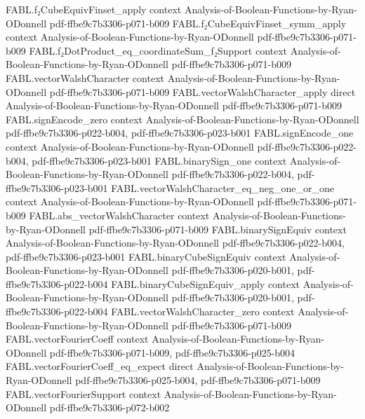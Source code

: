 \begin{theorem}
  {FABL.f₂CubeEquivFinset_apply}
  {context}
  {Analysis-of-Boolean-Functions-by-Ryan-ODonnell}
  {pdf-ffbe9c7b3306-p071-b009}
\proofstep
  {FABL.f₂CubeEquivFinset_symm_apply}
  {context}
  {Analysis-of-Boolean-Functions-by-Ryan-ODonnell}
  {pdf-ffbe9c7b3306-p071-b009}
\proofstep
  {FABL.f₂DotProduct_eq_coordinateSum_f₂Support}
  {context}
  {Analysis-of-Boolean-Functions-by-Ryan-ODonnell}
  {pdf-ffbe9c7b3306-p071-b009}
\proofstep
  {FABL.vectorWalshCharacter}
  {context}
  {Analysis-of-Boolean-Functions-by-Ryan-ODonnell}
  {pdf-ffbe9c7b3306-p071-b009}
\proofstep
  {FABL.vectorWalshCharacter_apply}
  {direct}
  {Analysis-of-Boolean-Functions-by-Ryan-ODonnell}
  {pdf-ffbe9c7b3306-p071-b009}
\proofstep
  {FABL.signEncode_zero}
  {context}
  {Analysis-of-Boolean-Functions-by-Ryan-ODonnell}
  {pdf-ffbe9c7b3306-p022-b004,
    pdf-ffbe9c7b3306-p023-b001}
\proofstep
  {FABL.signEncode_one}
  {context}
  {Analysis-of-Boolean-Functions-by-Ryan-ODonnell}
  {pdf-ffbe9c7b3306-p022-b004,
    pdf-ffbe9c7b3306-p023-b001}
\proofstep
  {FABL.binarySign_one}
  {context}
  {Analysis-of-Boolean-Functions-by-Ryan-ODonnell}
  {pdf-ffbe9c7b3306-p022-b004,
    pdf-ffbe9c7b3306-p023-b001}
\proofstep
  {FABL.vectorWalshCharacter_eq_neg_one_or_one}
  {context}
  {Analysis-of-Boolean-Functions-by-Ryan-ODonnell}
  {pdf-ffbe9c7b3306-p071-b009}
\proofstep
  {FABL.abs_vectorWalshCharacter}
  {context}
  {Analysis-of-Boolean-Functions-by-Ryan-ODonnell}
  {pdf-ffbe9c7b3306-p071-b009}
\proofstep
  {FABL.binarySignEquiv}
  {context}
  {Analysis-of-Boolean-Functions-by-Ryan-ODonnell}
  {pdf-ffbe9c7b3306-p022-b004,
    pdf-ffbe9c7b3306-p023-b001}
\proofstep
  {FABL.binaryCubeSignEquiv}
  {context}
  {Analysis-of-Boolean-Functions-by-Ryan-ODonnell}
  {pdf-ffbe9c7b3306-p020-b001,
    pdf-ffbe9c7b3306-p022-b004}
\proofstep
  {FABL.binaryCubeSignEquiv_apply}
  {context}
  {Analysis-of-Boolean-Functions-by-Ryan-ODonnell}
  {pdf-ffbe9c7b3306-p020-b001,
    pdf-ffbe9c7b3306-p022-b004}
\proofstep
  {FABL.vectorWalshCharacter_zero}
  {context}
  {Analysis-of-Boolean-Functions-by-Ryan-ODonnell}
  {pdf-ffbe9c7b3306-p071-b009}
\proofstep
  {FABL.vectorFourierCoeff}
  {context}
  {Analysis-of-Boolean-Functions-by-Ryan-ODonnell}
  {pdf-ffbe9c7b3306-p071-b009,
    pdf-ffbe9c7b3306-p025-b004}
\proofstep
  {FABL.vectorFourierCoeff_eq_expect}
  {direct}
  {Analysis-of-Boolean-Functions-by-Ryan-ODonnell}
  {pdf-ffbe9c7b3306-p025-b004,
    pdf-ffbe9c7b3306-p071-b009}
\proofstep
  {FABL.vectorFourierSupport}
  {context}
  {Analysis-of-Boolean-Functions-by-Ryan-ODonnell}
  {pdf-ffbe9c7b3306-p072-b002}
\proofstep

\end{theorem}
